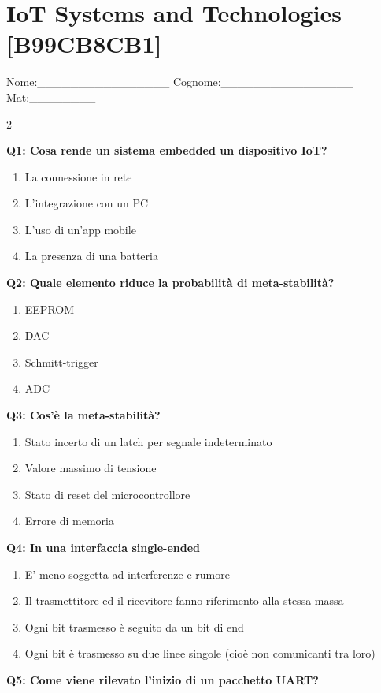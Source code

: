 \documentclass[10pt]{article}
\begin{document}
\section*{IoT Systems and Technologies \footnotesize [B99CB8CB1]}
{\footnotesize Nome:\_\_\_\_\_\_\_\_\_\_\_\_\_\_\_\_ Cognome:\_\_\_\_\_\_\_\_\_\_\_\_\_\_\_\_ Mat:\_\_\_\_\_\_\_\_}
\begin{multicols}{2}

\textbf{Q1: Cosa rende un sistema embedded un dispositivo IoT?}

\begin{enumerate}[label=\arabic*.]
\item La connessione in rete
\item L’integrazione con un PC
\item L’uso di un'app mobile
\item La presenza di una batteria
\end{enumerate}
\textbf{Q2: Quale elemento riduce la probabilità di meta-stabilità?}

\begin{enumerate}[label=\arabic*.]
\item EEPROM
\item DAC
\item Schmitt-trigger
\item ADC
\end{enumerate}
\textbf{Q3: Cos'è la meta-stabilità?}

\begin{enumerate}[label=\arabic*.]
\item Stato incerto di un latch per segnale indeterminato
\item Valore massimo di tensione
\item Stato di reset del microcontrollore
\item Errore di memoria
\end{enumerate}
\textbf{Q4: In una interfaccia single-ended}

\begin{enumerate}[label=\arabic*.]
\item E' meno soggetta ad interferenze e rumore
\item Il trasmettitore ed il ricevitore fanno riferimento alla stessa massa
\item Ogni bit trasmesso è seguito da un bit di end
\item Ogni bit è trasmesso su due linee singole (cioè non comunicanti tra loro)
\end{enumerate}
\textbf{Q5: Come viene rilevato l’inizio di un pacchetto UART?}


\end{multicols}
\end{document}

